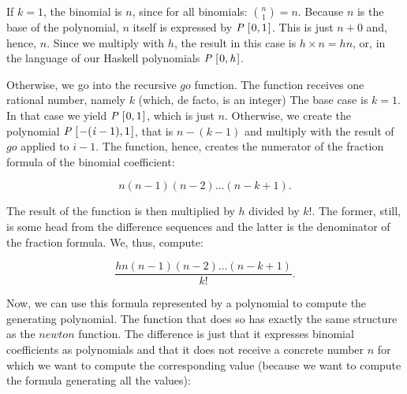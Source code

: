 \documentclass[tikz]{scrreprt}
\newcommand{\Conid}[1]{\mathit{#1}}
\newcommand{\Varid}[1]{\mathit{#1}}
\begin{document}
If $k=1$, the binomial is $n$, since for all binomials:
$\binom{n}{1} = n$. Because $n$ is the base of the polynomial,
$n$ itself is expressed by \ensuremath{\Conid{P}\;[\mskip1.5mu \mathrm{0},\mathrm{1}\mskip1.5mu]}. 
This is just $n+0$ and, hence, $n$.
Since we multiply with $h$, the result in this case is
$h \times n = hn$, or, in the language of our Haskell
polynomials \ensuremath{\Conid{P}\;[\mskip1.5mu \mathrm{0},\Varid{h}\mskip1.5mu]}.

Otherwise, we go into the recursive \ensuremath{\Varid{go}} function.
The function receives one rational number, namely $k$
(which, de facto, is an integer)
The base case is $k=1$. In that case we yield \ensuremath{\Conid{P}\;[\mskip1.5mu \mathrm{0},\mathrm{1}\mskip1.5mu]},
which is just $n$.
Otherwise, we create the polynomial
\ensuremath{\Conid{P}\;[\mskip1.5mu \mathbin{-}(\Varid{i}\mathbin{-}\mathrm{1}),\mathrm{1}\mskip1.5mu]}, that is $n-(k-1)$ and multiply
with the result of \ensuremath{\Varid{go}} applied to $i-1$.
The function, hence, creates the numerator
of the fraction formula of the binomial coefficient:

\[
n(n-1)(n-2)\dots (n-k+1).
\]

The result of the function is then multiplied by
$h$ divided by $k!$. The former, still, is some head
from the difference sequences and
the latter is the denominator
of the fraction formula. We, thus, compute:

\[
\frac{hn(n-1)(n-2)\dots (n-k+1)}{k!}.
\]

Now, we can use this formula represented by a 
polynomial to compute the generating polynomial.
The function that does so has exactly the same
structure as the \ensuremath{\Varid{newton}} function. The difference
is just that it expresses binomial coefficients
as polynomials and that it does not receive 
a concrete number $n$ for which we want to compute
the corresponding value (because we want to compute
the formula generating all the values):
\end{document}
